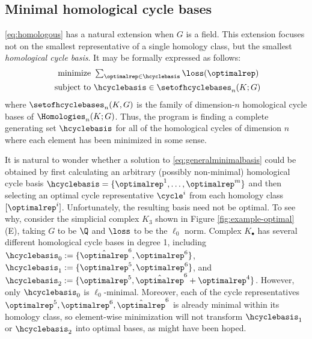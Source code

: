 

\subsection{Minimal homological cycle bases}

\pr \eqref{eq:homologous} has a natural extension when $G$ is a field.  This extension focuses not on the smallest representative of a single homology class, but the smallest  \emph{homological cycle basis}.  It may be formally expressed as follows:
\begin{align}
   \begin{split}
    \text{minimize } & \textstyle \sum_{\optimalrep \in \hcyclebasis} \loss(\optimalrep) \\
    \text{ subject to } & \hcyclebasis \in \setofhcyclebases_n(K ; G)
   \end{split}
   \label{eq:generalminimalbasis}
\end{align}
where $\setofhcyclebases_n(K, G)$ is the family of dimension-$n$ homological cycle bases of $\Homologies_n(K;G)$. Thus, the program is finding a complete generating set $\hcyclebasis$ for all of the homological cycles of dimension $n$ where each element has been minimized in some sense.  

It is natural to wonder whether a solution to \pr \eqref{eq:generalminimalbasis} could be obtained by first calculating an arbitrary (possibly non-minimal) homological cycle basis $\hcyclebasis = \{\optimalrep^1, \ldots, \optimalrep^m \}$ and then selecting an optimal cycle representative $\cycle^i$ from each homology class $[\optimalrep^i]$.    Unfortunately, the resulting basis need not be optimal.  To see why, consider the simplicial complex $K_3$ shown in Figure \ref{fig:example-optimal} (E), taking $G$ to be $\Q$ and $\loss$ to be the $\ell_0$ norm.  Complex $K_{\bullet}$ has several different homological cycle bases in degree 1, including  $\hcyclebasis_0: = \{\hat \optimalrep^6, \optimalrep^6\}$, $\hcyclebasis_1: = \{\optimalrep^5,  \optimalrep^6\}$, and $\hcyclebasis_2: = \{ \optimalrep^5,  \hat \optimalrep^6 + \optimalrep^4\}$.  However, only $\hcyclebasis_0$ is $\ell_0$-minimal.  Moreover, each of the cycle representatives $\optimalrep^5, \optimalrep^6, \hat \optimalrep^6$ is already minimal within its homology class, so element-wise minimization will not transform  $\hcyclebasis_1$ or $\hcyclebasis_2$ into optimal bases, as might have been hoped. %


